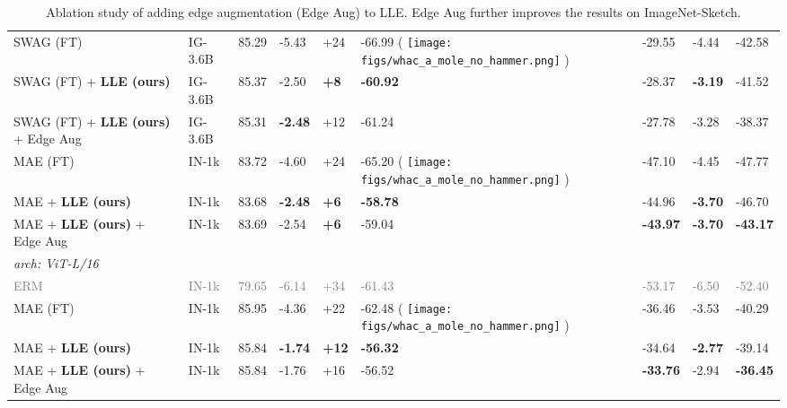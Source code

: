 \documentclass[10pt,twocolumn,letterpaper]{article}
\DeclareRobustCommand{\molenohammer}{\begingroup\normalfont
  \texttt{[image: figs/whac\_a\_mole\_no\_hammer.png]}\endgroup
}
\begin{document}
\begin{table*}[t]
\begin{adjustbox}{width=\linewidth}
\begin{tabular}{@{}lllllllll@{}}
SWAG (FT)              & IG-3.6B    & 85.29         & -5.43           & +24          & -66.99  \scriptsize{(\textcolor{red}{} \molenohammer)}        & -29.55           & -4.44       &    -42.58      \\
SWAG (FT) + \textbf{LLE (ours)}  & IG-3.6B      & 85.37                  & -2.50  & \textbf{+8} & \textbf{-60.92} & -28.37 & \textbf{-3.19} & -41.52 \\
SWAG (FT) + \textbf{LLE (ours)} + Edge Aug & IG-3.6B      & 85.31                  & \textbf{-2.48}  & +12 & -61.24 & -27.78 & -3.28 & -38.37 \\ \cmidrule{2-9}
MAE (FT)  & IN-1k      & 83.72                   & -4.60             & +24 & -65.20 \scriptsize{(\textcolor{red}{} \molenohammer)} & -47.10 & -4.45  &   -47.77                      \\
MAE + \textbf{LLE (ours)}    & IN-1k      & 83.68                   & \textbf{-2.48}             & \textbf{+6} & \textbf{-58.78} & -44.96 & \textbf{-3.70}  &      -46.70                   \\
MAE + \textbf{LLE (ours)} + Edge Aug   & IN-1k      & 83.69                   & -2.54             & \textbf{+6} & -59.04 & \textbf{-43.97} & \textbf{-3.70} &    \textbf{-43.17}                      \\\midrule
\textit{arch: ViT-L/16}             &      &                    &          &           &          &         &        &         \\
\textcolor{gray}{ERM}    & \textcolor{gray}{IN-1k}      & \textcolor{gray}{79.65} & \textcolor{gray}{-6.14}   & \textcolor{gray}{+34}          & \textcolor{gray}{-61.43}           & \textcolor{gray}{-53.17}          & \textcolor{gray}{-6.50}     &  \textcolor{gray}{-52.40}          \\
MAE (FT)    & IN-1k      & 85.95         & -4.36           & +22          & -62.48 \scriptsize{(\textcolor{red}{} \molenohammer)}         & -36.46          & -3.53     &   -40.29                  \\
MAE + \textbf{LLE (ours)}  & IN-1k      & 85.84                  & \textbf{-1.74}  & \textbf{+12} & \textbf{-56.32} & -34.64  & \textbf{-2.77}   &    -39.14          \\
MAE + \textbf{LLE (ours)} + Edge Aug & IN-1k      & 85.84                  & -1.76  & +16 &  -56.52 & \textbf{-33.76}  & -2.94  &  \textbf{-36.45}             \\
\bottomrule
\end{tabular}
\end{adjustbox}
\caption{Ablation study of adding edge augmentation (Edge Aug) to LLE. Edge Aug further improves the results on ImageNet-Sketch.}
\label{appx:tab:imagenet_results_w_edge_aug}
\end{table*}
\end{document}
